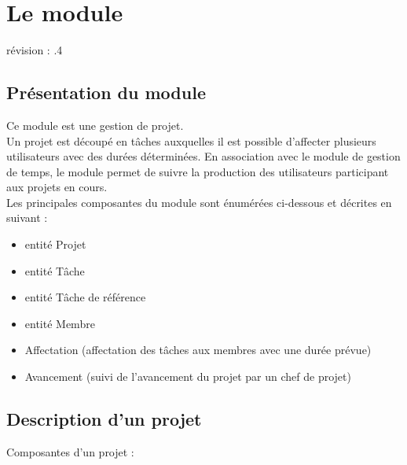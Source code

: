 
\clearpage
\section{Le module \project}

révision : .4

\subsection{Présentation du module \project}

Ce module est une gestion de projet.\\

Un projet est découpé en tâches auxquelles il est possible d'affecter plusieurs utilisateurs avec des durées déterminées.
En association avec le module de gestion de temps, le module \project permet de suivre la production des utilisateurs participant aux projets en cours.\\

Les principales composantes du module \project sont énumérées ci-dessous et décrites en suivant :

\begin{itemize}
\item entité Projet
\item entité Tâche
\item entité Tâche de référence
\item entité Membre
\item Affectation (affectation des tâches aux membres avec une durée prévue)
\item Avancement (suivi de l'avancement du projet par un chef de projet)
\end{itemize}

\subsection{Description d'un projet}

Composantes d'un projet :\\

